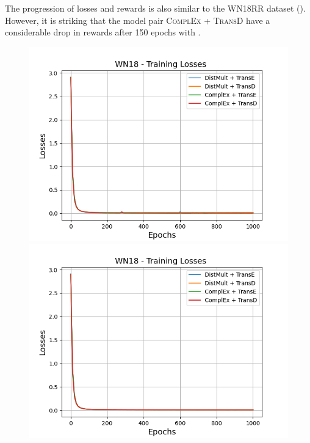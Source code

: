 The progression of losses and rewards is also similar to the \textsc{WN18RR} dataset ().
However, it is striking that the model pair \textsc{ComplEx} + \textsc{TransD} have a considerable drop in rewards after 150 epochs with \usmax.
\clearpage
\begin{figure}[H]
    \centering
    \begin{minipage}{.5\textwidth}
      \centering
      \includegraphics[width=0.9\linewidth]{figures/results/gan_train/not_pretrained/uncertainty/max/entropy/wn18/1k_epochs/uncertainty_wn18_losses.png}
    \end{minipage}%
    \begin{minipage}{.5\textwidth}
      \centering
      \includegraphics[width=0.9\linewidth]{figures/results/gan_train/not_pretrained/uncertainty/max_distribution/entropy/wn18/1k_epochs/uncertainty_wn18_losses.png}

\end{minipage}
\end{figure}
